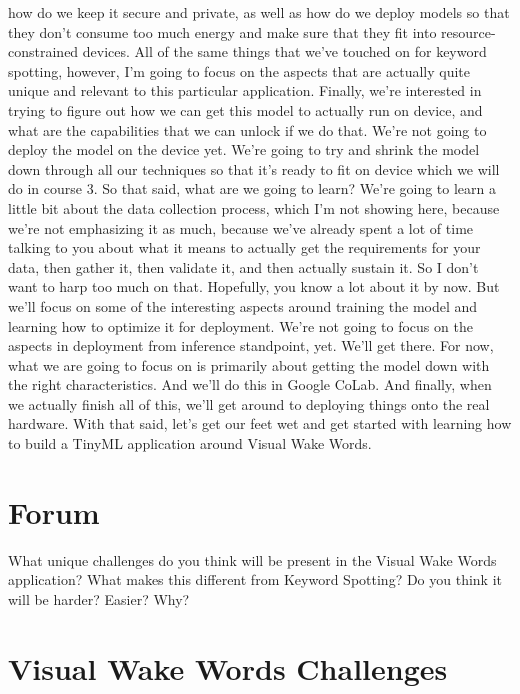   how do we keep it secure and private, as well as
  how do we deploy models so that they don't consume too much energy
  and make sure that they fit into resource-constrained devices.
  All of the same things that we've touched on for keyword spotting,
  however, I'm going to focus on the aspects that
  are actually quite unique and relevant to this particular application.
  Finally, we're interested in trying to figure out
  how we can get this model to actually run on device,
  and what are the capabilities that we can unlock if we do that.
  We're not going to deploy the model on the device yet.
  We're going to try and shrink the model down through all our techniques
  so that it's ready to fit on device which we will do in course 3.
  So that said, what are we going to learn?
  We're going to learn a little bit about the data collection process, which
  I'm not showing here, because we're not emphasizing it as much, because we've
  already spent a lot of time talking to you about what it means to actually get
  the requirements for your data, then gather it, then validate it, and then
  actually sustain it.
  So I don't want to harp too much on that.
  Hopefully, you know a lot about it by now.
  But we'll focus on some of the interesting aspects
  around training the model and learning how to optimize it for deployment.
  We're not going to focus on the aspects in deployment
  from inference standpoint, yet.
  We'll get there.
  For now, what we are going to focus on is primarily
  about getting the model down with the right characteristics.
  And we'll do this in Google CoLab.
  And finally, when we actually finish all of this,
  we'll get around to deploying things onto the real hardware.
  With that said, let's get our feet wet and get
  started with learning how to build a TinyML application around Visual Wake
  Words.
  
  \section{Forum}
  
  What unique challenges do you think will be present in the Visual Wake Words application? What makes this different from Keyword Spotting? Do you think it will be harder? Easier? Why?
  
  \section{Visual Wake Words Challenges}
  
